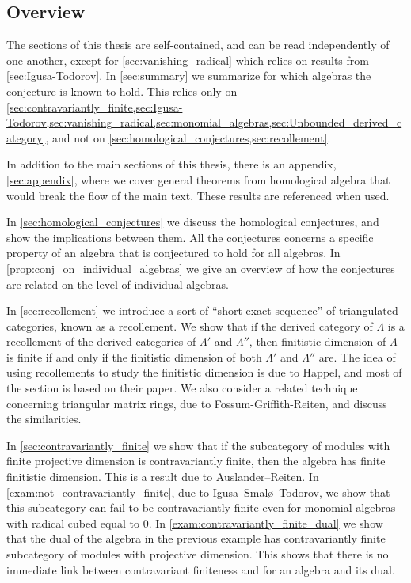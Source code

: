 \subsection*{Overview}
The sections of this thesis are self-contained, and can be read independently of one another, except for \cref{sec:vanishing_radical} which relies on results from \cref{sec:Igusa-Todorov}. In \cref{sec:summary} we summarize for which algebras the conjecture is known to hold. This relies only on \cref{sec:contravariantly_finite,sec:Igusa-Todorov,sec:vanishing_radical,sec:monomial_algebras,sec:Unbounded_derived_category}, and not on \cref{sec:homological_conjectures,sec:recollement}.

In addition to the main sections of this thesis, there is an appendix, \cref{sec:appendix}, where we cover general theorems from homological algebra that would break the flow of the main text. These results are referenced when used.

In \cref{sec:homological_conjectures} we discuss the homological conjectures, and show the implications between them. All the conjectures concerns a specific property of an algebra that is conjectured to hold for all algebras. In \cref{prop:conj_on_individual_algebras} we give an overview of how the conjectures are related on the level of individual algebras.

In \cref{sec:recollement} we introduce a sort of ``short exact sequence'' of triangulated categories, known as a recollement. We show that if the derived category of $\Lambda$ is a recollement of the derived categories of $\Lambda'$ and $\Lambda''$, then finitistic dimension of $\Lambda$ is finite if and only if the finitistic dimension of both $\Lambda'$ and $\Lambda''$ are. The idea of using recollements to study the finitistic dimension is due to Happel, and most of the section is based on their paper\cite{Hap93}. We also consider a related technique concerning triangular matrix rings, due to Fossum-Griffith-Reiten\cite{FGR75}, and discuss the similarities.

In \cref{sec:contravariantly_finite} we show that if the subcategory of modules with finite projective dimension is contravariantly finite, then the algebra has finite finitistic dimension. This is a result due to Auslander--Reiten\cite{AR91}. In \cref{exam:not_contravariantly_finite}, due to Igusa--Smalø--Todorov\cite{IST90}, we show that this subcategory can fail to be contravariantly finite even for monomial algebras with radical cubed equal to 0. In \cref{exam:contravariantly_finite_dual} we show that the dual of the algebra in the previous example has contravariantly finite subcategory of modules with projective dimension. This shows that there is no immediate link between contravariant finiteness and for an algebra and its dual.

